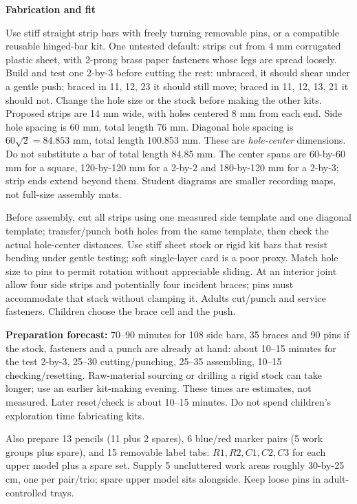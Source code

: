 \documentclass[letterpaper,11pt]{article}
\newcommand{\sub}[1]{\par\textbf{#1}\par}
\begin{document}
\sub{Fabrication and fit}
Use stiff straight strip bars with freely turning removable pins, or a compatible reusable hinged-bar kit. One untested default: strips cut from 4 mm corrugated plastic sheet, with 2-prong brass paper fasteners whose legs are spread loosely. Build and test one 2-by-3 before cutting the rest: unbraced, it should shear under a gentle push; braced in 11, 12, 23 it should still move; braced in 11, 12, 13, 21 it should not. Change the hole size or the stock before making the other kits. Proposed strips are 14 mm wide, with holes centered 8 mm from each end. Side hole spacing is 60 mm, total length 76 mm. Diagonal hole spacing is $60\sqrt2=84.853$ mm, total length 100.853 mm. These are \emph{hole-center} dimensions. Do not substitute a bar of total length 84.85 mm. The center spans are 60-by-60 mm for a square, 120-by-120 mm for a 2-by-2 and 180-by-120 mm for a 2-by-3; strip ends extend beyond them. Student diagrams are smaller recording maps, not full-size assembly mats.

Before assembly, cut all strips using one measured side template and one diagonal template; transfer/punch both holes from the same template, then check the actual hole-center distances. Use stiff sheet stock or rigid kit bars that resist bending under gentle testing; soft single-layer card is a poor proxy. Match hole size to pins to permit rotation without appreciable sliding. At an interior joint allow four side strips and potentially four incident braces; pins must accommodate that stack without clamping it. Adults cut/punch and service fasteners. Children choose the brace cell and the push.

\textbf{Preparation forecast:} 70--90 minutes for 108 side bars, 35 braces and 90 pins if the stock, fasteners and a punch are already at hand: about 10--15 minutes for the test 2-by-3, 25--30 cutting/punching, 25--35 assembling, 10--15 checking/resetting. Raw-material sourcing or drilling a rigid stock can take longer; use an earlier kit-making evening. These times are estimates, not measured. Later reset/check is about 10--15 minutes. Do not spend children's exploration time fabricating kits.

Also prepare 13 pencils (11 plus 2 spares), 6 blue/red marker pairs (5 work groups plus spare), and 15 removable label tabs: $R1,R2,C1,C2,C3$ for each upper model plus a spare set. Supply 5 uncluttered work areas roughly 30-by-25 cm, one per pair/trio; spare upper model sits alongside. Keep loose pins in adult-controlled trays.
\end{document}
